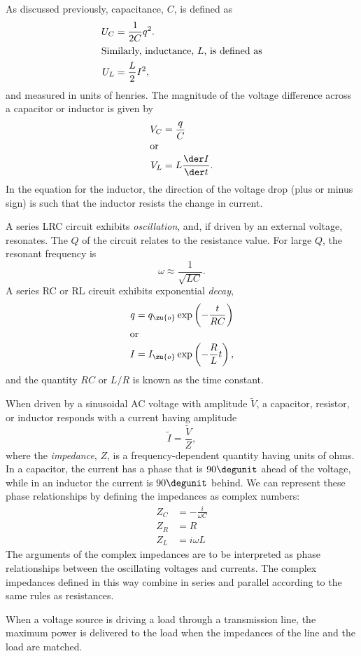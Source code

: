 As discussed previously, capacitance, $C$, is defined as
	\begin{align*}
		U_C    &=   \frac{1}{2C}q^2   . \\
	\intertext{Similarly, inductance, $L$, is defined as}
		U_L    &=    \frac{L}{2}I^2,
	\end{align*}
	and measured in units of  henries.
	The magnitude of the voltage difference across a capacitor or inductor is given by
	\begin{align*}
		V_C	&= \frac{q}{C} \\
	\intertext{or}
		V_L	&= L\frac{\der I}{\der t}.
	\end{align*}
	In the equation for the inductor, the
	direction of the voltage drop (plus or minus sign) is such
	that the inductor resists the change in current.
	
	A series LRC circuit exhibits \emph{oscillation}, and, if driven
	by an external voltage, resonates.
	The $Q$ of the circuit relates to the resistance value. For large
	$Q$, the resonant frequency is
	\begin{equation*}
	  \omega \approx \frac{1}{\sqrt{LC}}.
	\end{equation*}
	A series RC or RL circuit exhibits exponential \emph{decay},
	\begin{align*}
		q &= q_\zu{o}\exp\left(-\frac{t}{RC}\right) \\
	\intertext{or}
		I &= I_\zu{o}\exp\left(-\frac{R}{L}t\right),
	\end{align*}
	and the quantity $RC$ or $L/R$ is known as the time constant.

	When driven by a sinusoidal AC voltage with amplitude $\tilde{V}$,
	a capacitor, resistor, or inductor responds with a current
	having amplitude
	\begin{equation*}
		\tilde{I} = \frac{\tilde{V}}{Z}  ,
	\end{equation*}
	where the \emph{impedance\/}, $Z$, is a frequency-dependent quantity
	having units of ohms.
	In a capacitor, the current has a phase that is $90\degunit$ ahead of the voltage,
	while in an inductor the current is $90\degunit$ behind.
        We can represent these phase relationships by defining the impedances
	 as complex numbers:
	 \begin{align*}
		Z_C &= -\frac{i}{\omega C}\\
		Z_R	&= R\\
		Z_L &= i\omega L 
	\end{align*}
	The arguments of the complex impedances are to be interpreted as phase relationships between the
	oscillating voltages and currents.
	The complex impedances defined in this way combine in series and parallel
	 according to the same rules as resistances.

	When a voltage source is driving a load through a transmission line, the maximum
	power is delivered to the load when the impedances of the line and the load
	are matched.
